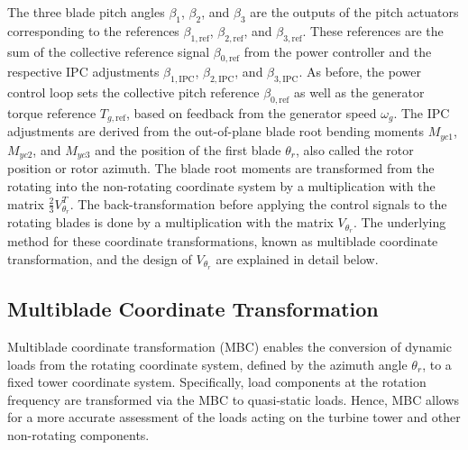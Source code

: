 The three blade pitch angles $\beta_1$, $\beta_2$, and $\beta_3$ are the outputs of the pitch actuators corresponding to the references $\beta_{1,\text{ref}}$, $\beta_{2,\text{ref}}$, and $\beta_{3,\text{ref}}$. These references are the sum of the collective reference signal $\beta_{0,\text{ref}}$ from the power controller and the respective IPC adjustments $\beta_{1,\text{IPC}}$, $\beta_{2,\text{IPC}}$, and $\beta_{3,\text{IPC}}$.
%
As before, the power control loop sets the collective pitch reference $\beta_{0,\text{ref}}$ as well as the generator torque reference $T_{g,\text{ref}}$, based on feedback from the generator speed $\omega_g$.
%
The IPC adjustments are derived from the out-of-plane blade root bending moments $M_{yc1}$, $M_{yc2}$, and $M_{yc3}$ and the position of the first blade $\theta_{r}$, also called the rotor position or rotor azimuth. The blade root moments are transformed from the rotating into the non-rotating coordinate system by a multiplication with the matrix $\frac{2}{3}V_{\theta_{r}}^{T}$. The back-transformation before applying the control signals to the rotating blades is done by a multiplication with the matrix $V_{\theta_{r}}$. The underlying method for these coordinate transformations, known as multiblade coordinate transformation, and the design of $V_{\theta_{r}}$ are explained in detail below.


\subsection{Multiblade Coordinate Transformation} \label{sec:MBC}
Multiblade coordinate transformation (MBC) enables the conversion of dynamic loads from the rotating coordinate system, defined by the azimuth angle $\theta_{r}$, to a fixed tower coordinate system. Specifically, load components at the rotation frequency are transformed via the MBC to quasi-static loads. Hence, MBC allows for a more accurate assessment of the loads acting on the turbine tower and other non-rotating components. 

